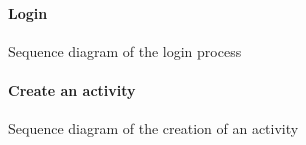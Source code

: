 \documentclass[12pt,titlepage]{article}
\begin{document}
\begin{figure}
\paragraph{Login}
\centering
{} 
\caption{Sequence diagram of the login process}
\end{figure}

\begin{figure}
\paragraph{Create an activity}
\centering
{} 
\caption{Sequence diagram of the creation of an activity}
\end{figure}
\end{document}
